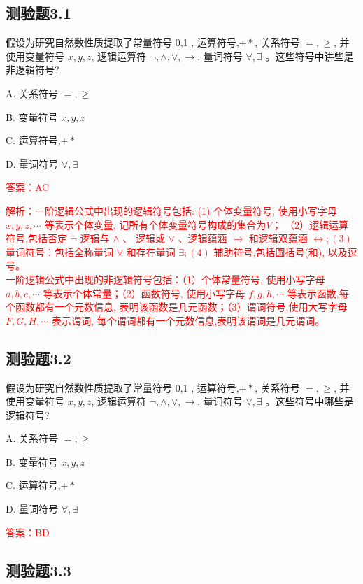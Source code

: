\documentclass[UTF8, heading=true]{ctexart}
\begin{document}
\subsection{测验题3.1}

假设为研究自然数性质提取了常量符号 0,1 , 运算符号,$+ *$, 关系符号 $=, \geq$, 并使用变量符号 $x, y, z$, 逻辑运算符 $\neg, \wedge, \vee, \rightarrow$, 量词符号 $\forall, \exists$ 。这些符号中讲些是非逻辑符号?

A. 关系符号 $=, \geq$

B. 变量符号 $x, y, z$

C. 运算符号,$+ *$

D. 量词符号 $\forall, \exists$

\textcolor{red}{答案：AC}

\textcolor{red}{解析：一阶逻辑公式中出现的逻辑符号包括: (1) 个体变量符号, 使用小写字母 $x, y, z, \cdots$ 等表示个体变量, 记所有个体变量符号构成的集合为$V$；
（2）逻辑运算符号,包括否定 $\neg$ 逻辑与 $\wedge$ 、
逻辑或 $\vee$ 、逻辑蕴涵 $\rightarrow$ 和逻辑双蕴涵 
$\leftrightarrow ;(3)$ 量词符号：包括全称量词 $\forall$ 
和存在量词 $\exists ;(4)$ 辅助符号,包括圆括号(和), 以及逗号。
\\ \indent 一阶逻辑公式中出现的非逻辑符号包括：（1）个体常量符号,
使用小写字母 $a, b, c, \cdots$ 等表示个体常量；（2）函数符号,
使用小写字母 $f, g, h, \cdots$ 等表示函数,每个函数都有一个元数信息,
表明该函数是几元函数；（3）谓词符号,使用大写字母 $F, G, H, \cdots$ 表示谓词,
每个谓词都有一个元数信息,表明该谓词是几元谓词。}

\subsection{测验题3.2}

假设为研究自然数性质提取了常量符号 0,1 , 运算符号,$+ *$, 关系符号 $=, \geq$, 并使用变量符号 $x, y, z$, 逻辑运算符 $\neg, \wedge, \vee, \rightarrow$, 量词符号 $\forall, \exists$ 。这些符号中哪些是逻辑符号?

A. 关系符号 $=, \geq$

B. 变量符号 $x, y, z$

C. 运算符号,$+ *$

D. 量词符号 $\forall, \exists$

\textcolor{red}{答案：BD}


\subsection{测验题3.3}
\end{document}
